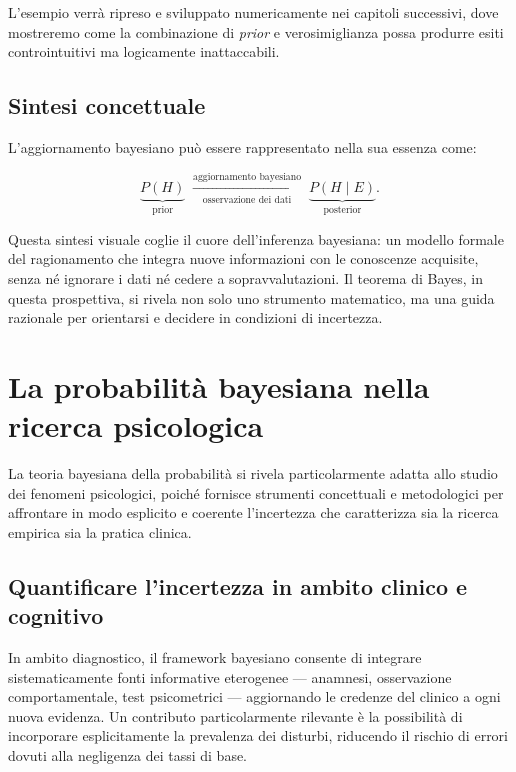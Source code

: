 \documentclass[
  italian,
  letterpaper,
  a4paper,
  11pt,
  open=any]{scrbook}
\theoremstyle{plain}
\theoremstyle{definition}
\theoremstyle{definition}
\theoremstyle{remark}
\begin{document}
L'esempio verrà ripreso e sviluppato numericamente nei capitoli
successivi, dove mostreremo come la combinazione di \emph{prior} e
verosimiglianza possa produrre esiti controintuitivi ma logicamente
inattaccabili.

\subsection{Sintesi concettuale}\label{sintesi-concettuale}

L'aggiornamento bayesiano può essere rappresentato nella sua essenza
come:

\[
\underbrace{P(H)}_{\text{prior}}
\;\xrightarrow[\text{osservazione dei dati}]{\text{aggiornamento bayesiano}}\;
\underbrace{P(H \mid E)}_{\text{posterior}}.
\]

Questa sintesi visuale coglie il cuore dell'inferenza bayesiana: un
modello formale del ragionamento che integra nuove informazioni con le
conoscenze acquisite, senza né ignorare i dati né cedere a
sopravvalutazioni. Il teorema di Bayes, in questa prospettiva, si rivela
non solo uno strumento matematico, ma una guida razionale per orientarsi
e decidere in condizioni di incertezza.

\section{La probabilità bayesiana nella ricerca
psicologica}\label{la-probabilituxe0-bayesiana-nella-ricerca-psicologica}

La teoria bayesiana della probabilità si rivela particolarmente adatta
allo studio dei fenomeni psicologici, poiché fornisce strumenti
concettuali e metodologici per affrontare in modo esplicito e coerente
l'incertezza che caratterizza sia la ricerca empirica sia la pratica
clinica.

\subsection{Quantificare l'incertezza in ambito clinico e
cognitivo}\label{quantificare-lincertezza-in-ambito-clinico-e-cognitivo}

In ambito diagnostico, il framework bayesiano consente di integrare
sistematicamente fonti informative eterogenee --- anamnesi, osservazione
comportamentale, test psicometrici --- aggiornando le credenze del
clinico a ogni nuova evidenza. Un contributo particolarmente rilevante è
la possibilità di incorporare esplicitamente la prevalenza dei disturbi,
riducendo il rischio di errori dovuti alla negligenza dei tassi di base.
\end{document}
